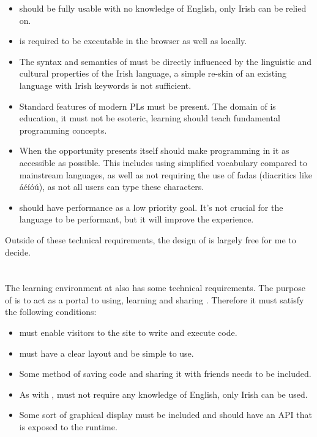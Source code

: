 \begin{itemize}
    \item \Setanta{} should be fully usable with no knowledge of English, only Irish can be relied on.
    \item \Setanta{} is required to be executable in the browser as well as locally.
    \item The syntax and semantics of \Setanta{} must be directly influenced by the linguistic and cultural properties of the Irish language, a simple re-skin of an existing language with Irish keywords is not sufficient.
    \item Standard features of modern PLs must be present. The domain of \Setanta{} is education, it must not be esoteric, learning \Setanta{} should teach fundamental programming concepts.
    \item When the opportunity presents itself \Setanta{} should make programming in it as accessible as possible. This includes using simplified vocabulary compared to mainstream languages, as well as not requiring the use of fadas (diacritics like áéíóú), as not all users can type these characters.
    \item \Setanta{} should have performance as a low priority goal. It's not crucial for the language to be performant, but it will improve the experience.
\end{itemize}

Outside of these technical requirements, the design of \Setanta{} is largely free for me to decide.

\section{\trys{}}

The learning environment at \trys{} also has some technical requirements. The purpose of \trys{} is to act as a portal to using, learning and sharing \Setanta{}. Therefore it must satisfy the following conditions:
\begin{itemize}
    \item \trys{} must enable visitors to the site to write and execute \Setanta{} code.
    \item \trys{} must have a clear layout and be simple to use.
    \item Some method of saving code and sharing it with friends needs to be included.
    \item As with \Setanta{}, \trys{} must not require any knowledge of English, only Irish can be used.
    \item Some sort of graphical display must be included and should have an API that is exposed to the \Setanta{} runtime.
\end{itemize}
